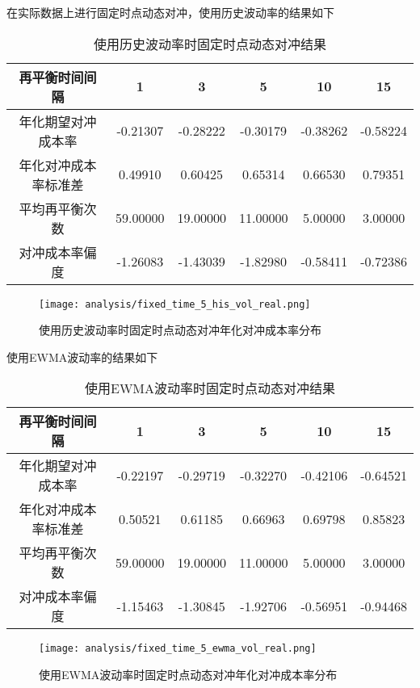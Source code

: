 在实际数据上进行固定时点动态对冲，使用历史波动率的结果如下

\begin{table}[htbp]
  \centering
  \caption{使用历史波动率时固定时点动态对冲结果}
  \label{tab:fixed_time_5_his_vol_real}
  \begin{tabular}{cccccc}
    \toprule
    再平衡时间间隔 & 1 & 3 & 5 & 10 & 15 \\
    \midrule
    年化期望对冲成本率 & -0.21307 & -0.28222 & -0.30179 & -0.38262 & -0.58224 \\
    年化对冲成本率标准差 & 0.49910 & 0.60425 & 0.65314 & 0.66530 & 0.79351 \\
    平均再平衡次数 & 59.00000 & 19.00000 & 11.00000 & 5.00000 & 3.00000 \\
    对冲成本率偏度 & -1.26083 & -1.43039 & -1.82980 & -0.58411 & -0.72386 \\
    \bottomrule
  \end{tabular}
\end{table}

\begin{figure}[htb]
  \centering
  \texttt{[image: analysis/fixed\_time\_5\_his\_vol\_real.png]}
  \caption[这里将出现在插图索引中]
    {使用历史波动率时固定时点动态对冲年化对冲成本率分布}
  \label{fig:fixed_time_5_his_vol_real}
\end{figure}
使用EWMA波动率的结果如下

\begin{table}[htbp]
  \centering
  \caption{使用EWMA波动率时固定时点动态对冲结果}
  \label{tab:fixed_time_5_ewma_vol_real}
  \begin{tabular}{cccccc}
    \toprule
    再平衡时间间隔 & 1 & 3 & 5 & 10 & 15 \\
    \midrule
    年化期望对冲成本率 & -0.22197 & -0.29719 & -0.32270 & -0.42106 & -0.64521 \\
    年化对冲成本率标准差 & 0.50521 & 0.61185 & 0.66963 & 0.69798 & 0.85823 \\
    平均再平衡次数 & 59.00000 & 19.00000 & 11.00000 & 5.00000 & 3.00000 \\
    对冲成本率偏度 & -1.15463 & -1.30845 & -1.92706 & -0.56951 & -0.94468 \\
    \bottomrule
  \end{tabular}
\end{table}

\begin{figure}[htb]
  \centering
  \texttt{[image: analysis/fixed\_time\_5\_ewma\_vol\_real.png]}
  \caption[这里将出现在插图索引中]
    {使用EWMA波动率时固定时点动态对冲年化对冲成本率分布}
  \label{fig:fixed_time_5_ewma_vol_real}
\end{figure}

